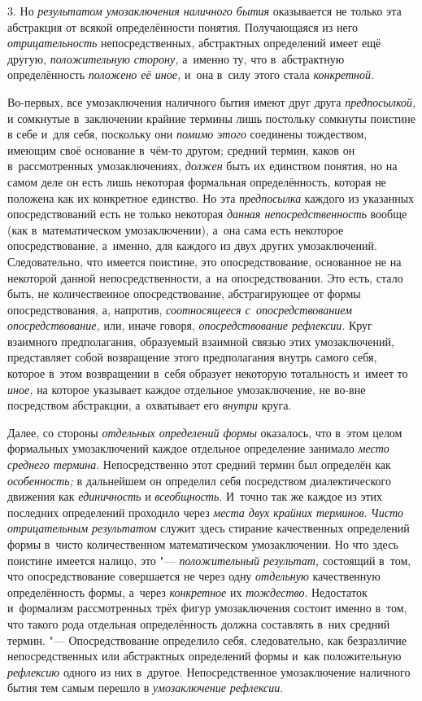3. Но {\em результатом
умозаключения наличного бытия} оказывается не только эта
абстракция от всякой определённости понятия. Получающаяся из него
{\em отрицательность}
непосредственных, абстрактных определений имеет ещё другую,
{\em положительную сторону,}
а~именно ту, что в~абстрактную определённость
{\em положено её иное,}
и~она в~силу этого стала
{\em конкретной}.

Во-первых, все умозаключения наличного бытия имеют друг друга
{\em предпосылкой,} и
сомкнутые в~заключении крайние термины лишь постольку сомкнуты поистине в
себе и~для себя, поскольку они {\em помимо этого}
соединены тождеством, имеющим своё основание в~чём-то другом;
средний термин, каков он в~рассмотренных умозаключениях, {\em должен} быть
их единством понятия, но на самом деле он есть лишь некоторая формальная
определённость, которая не положена как их конкретное единство. Но эта
{\em предпосылка} каждого из указанных опосредствований есть не только
некоторая {\em данная непосредственность}
вообще (как в~математическом умозаключении), а~она сама есть
некоторое опосредствование, а~именно, для каждого из двух других
умозаключений. Следовательно, что имеется поистине, это опосредствование,
основанное не на некоторой данной непосредственности, а~на
опосредствовании. Это есть, стало быть, не количественное опосредствование,
абстрагирующее от формы опосредствования, а, напротив,
{\em соотносящееся с~опосредствованием
опосредствование,} или, иначе говоря, {\em опосредствование рефлексии}.
Круг взаимного предполагания, образуемый взаимной связью этих
умозаключений, представляет собой возвращение этого предполагания внутрь
самого себя, которое в~этом возвращении в~себя образует некоторую
тотальность и~имеет то {\em иное,}
на которое указывает каждое отдельное умозаключение, не
во-вне посредством абстракции, а~охватывает его {\em внутри} круга.

Далее, со стороны {\em отдельных определений формы}
оказалось, что в~этом целом формальных умозаключений каждое
отдельное определение занимало {\em место среднего термина}.
Непосредственно этот средний термин был определён как {\em особенность;} в
дальнейшем он определил себя посредством диалектического движения как
{\em единичность} и {\em всеобщность}.
И~точно так же каждое из этих последних определений проходило через
{\em места двух крайних терминов}. {\em Чисто отрицательным результатом}
служит здесь стирание качественных определений формы в~чисто
количественном математическом умозаключении. Но что здесь поистине имеется
налицо, это "--- {\em положительный
результат,} состоящий в~том, что опосредствование
совершается не через одну {\em отдельную}
качественную определённость формы, а~через
{\em конкретное} их {\em тождество}.
Недостаток и~формализм рассмотренных трёх фигур умозаключения
состоит именно в~том, что такого рода отдельная определённость должна
составлять в~них средний термин. "--- Опосредствование
определило себя, следовательно, как безразличие непосредственных или
абстрактных определений формы и~как положительную
{\em рефлексию} одного из них в~другое. Непосредственное
умозаключение наличного бытия тем самым перешло в
{\em умозаключение рефлексии}.\label{bkm:bm110b}

